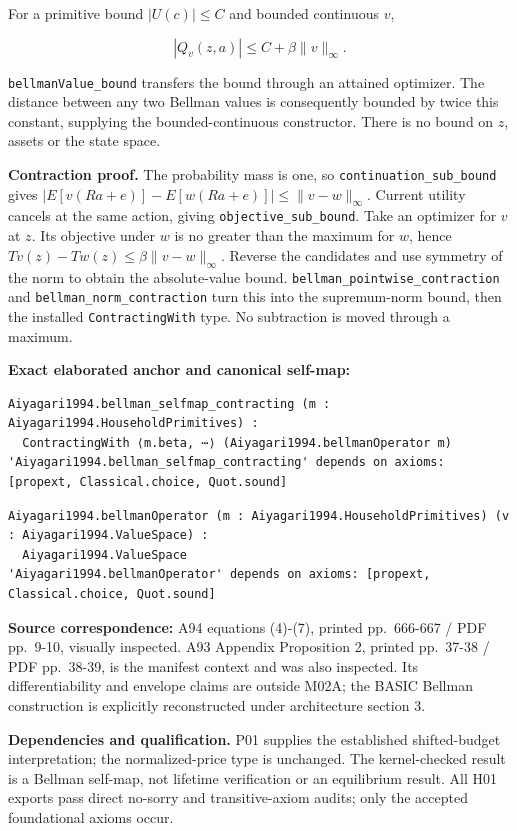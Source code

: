 \documentclass[
  11pt,
]{article}
\let\LedgerOriginalTexttt\texttt
\renewcommand{\texttt}[1]{{\small\LedgerOriginalTexttt{#1}}}
\begin{document}
For a primitive bound \(|U(c)|\leq C\) and bounded continuous \(v\),

\[|Q_v(z,a)|\leq C+\beta\|v\|_\infty.\]

\texttt{bellmanValue\_bound} transfers the bound through an attained
optimizer. The distance between any two Bellman values is consequently
bounded by twice this constant, supplying the bounded-continuous
constructor. There is no bound on \(z\), assets or the state space.

\textbf{Contraction proof.} The probability mass is one, so
\texttt{continuation\_sub\_bound} gives
\(|E[v(Ra+e)]-E[w(Ra+e)]|\leq\|v-w\|_\infty\). Current utility cancels
at the same action, giving \texttt{objective\_sub\_bound}. Take an
optimizer for \(v\) at \(z\). Its objective under \(w\) is no greater
than the maximum for \(w\), hence
\(T v(z)-T w(z)\leq\beta\|v-w\|_\infty\). Reverse the candidates and use
symmetry of the norm to obtain the absolute-value bound.
\texttt{bellman\_pointwise\_contraction} and
\texttt{bellman\_norm\_contraction} turn this into the supremum-norm
bound, then the installed \texttt{ContractingWith} type. No subtraction
is moved through a maximum.

\textbf{Exact elaborated anchor and canonical self-map:}

\begin{verbatim}
Aiyagari1994.bellman_selfmap_contracting (m : Aiyagari1994.HouseholdPrimitives) :
  ContractingWith ⟨m.beta, ⋯⟩ (Aiyagari1994.bellmanOperator m)
'Aiyagari1994.bellman_selfmap_contracting' depends on axioms: [propext, Classical.choice, Quot.sound]
\end{verbatim}

\begin{verbatim}
Aiyagari1994.bellmanOperator (m : Aiyagari1994.HouseholdPrimitives) (v : Aiyagari1994.ValueSpace) :
  Aiyagari1994.ValueSpace
'Aiyagari1994.bellmanOperator' depends on axioms: [propext, Classical.choice, Quot.sound]
\end{verbatim}

\textbf{Source correspondence:} A94 equations (4)-(7), printed
pp.~666-667 / PDF pp.~9-10, visually inspected. A93 Appendix Proposition
2, printed pp.~37-38 / PDF pp.~38-39, is the manifest context and was
also inspected. Its differentiability and envelope claims are outside
M02A; the BASIC Bellman construction is explicitly reconstructed under
architecture section 3.

\textbf{Dependencies and qualification.} P01 supplies the established
shifted-budget interpretation; the normalized-price type is unchanged.
The kernel-checked result is a Bellman self-map, not lifetime
verification or an equilibrium result. All H01 exports pass direct
no-sorry and transitive-axiom audits; only the accepted foundational
axioms occur.
\end{document}
